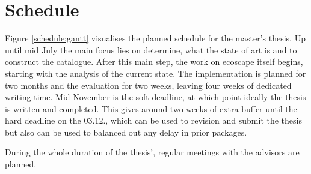 \chapter{Schedule}

Figure \ref{schedule:gantt} visualises the planned schedule for the master's thesis.
Up until mid July the main focus lies on determine, what the state of art is and to construct the catalogue.
After this main step, the work on ecoscape itself begins, starting with the analysis of the current state.
The implementation is planned for two months and the evaluation for two weeks, leaving four weeks of dedicated writing time.
Mid November is the soft deadline, at which point ideally the thesis is written and completed. 
This gives around two weeks of extra buffer until the hard deadline on the 03.12., which can be used to revision and submit the thesis but also can be used to balanced out any delay in prior packages.


During the whole duration of the thesis', regular meetings with the advisors are planned.

